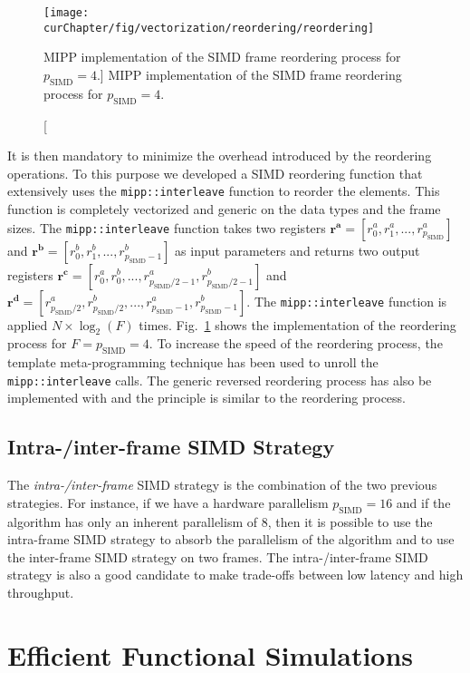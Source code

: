 \begin{figure}[htp]
  \centering
  \texttt{[image: \\curChapter/fig/vectorization/reordering/reordering]}
  \caption
    [MIPP implementation of the SIMD frame reordering process for
     $p_\text{SIMD} = 4$.]
    {MIPP implementation of the SIMD frame reordering process for
     $p_\text{SIMD} = 4$.}
  \label{fig:opt_vec_reordering}
\end{figure}

It is then mandatory to minimize the overhead introduced by the reordering
operations. To this purpose we developed a SIMD reordering function that
extensively uses the \verb|mipp::interleave| function to reorder the elements.
This function is completely vectorized and generic on the data types and the
frame sizes. The \verb|mipp::interleave| function takes two registers $\bm{r^a}
= [r^a_0, r^a_1, ..., r^a_{p_\text{SIMD}}]$ and $\bm{r^b} = [r^b_0, r^b_1,
..., r^b_{p_\text{SIMD}-1}]$ as input parameters and returns two output
registers $\bm{r^c} = [r^a_0, r^b_0, ..., r^a_{p_\text{SIMD}/2-1},
r^b_{p_\text{SIMD}/2-1}]$ and $\bm{r^d} = [r^a_{p_\text{SIMD}/2},
r^b_{p_\text{SIMD}/2}, ..., r^a_{p_\text{SIMD}-1}, r^b_{p_\text{SIMD}-1}]$.
The \verb|mipp::interleave| function is applied $N \times \log_2(F)$ times.
Fig.~\ref{fig:opt_vec_reordering} shows the \MIPP implementation of the
reordering process for $F = p_\text{SIMD} = 4$. To increase the speed of the
reordering process, the template meta-programming technique has been used to
unroll the \verb|mipp::interleave| calls. The generic reversed reordering
process has also be implemented with \MIPP and the principle is similar to the
reordering process.

\subsection{Intra-/inter-frame SIMD Strategy}

The \emph{intra-/inter-frame} SIMD strategy is the combination of the two
previous strategies. For instance, if we have a hardware parallelism
$p_\text{SIMD} = 16$ and if the algorithm has only an inherent parallelism of
8, then it is possible to use the intra-frame SIMD strategy to absorb the
parallelism of the algorithm and to use the inter-frame SIMD strategy on two
frames. The intra-/inter-frame SIMD strategy is also a good candidate to make
trade-offs between low latency and high throughput.

\section{Efficient Functional Simulations}
\label{sec:opt_simu}


